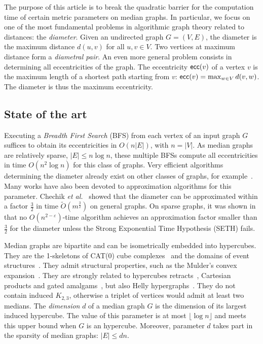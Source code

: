 \documentclass[a4paper,UKenglish,numberwithinsect,cleveref, autoref]{lipics-v2021}
\newcommand{\card}[1]{\left| #1 \right|}
\newcommand{\ecc}{\mbox{\textsf{ecc}}}
\begin{document}
The purpose of this article is to break the quadratic barrier for the computation time of certain metric parameters on median graphs. In particular, we focus on one of the most fundamental problems in algorithmic graph theory related to distances: the \textit{diameter}. Given an undirected graph $G=(V,E)$, the diameter is the maximum distance $d(u,v)$ for all $u,v \in V$. Two vertices at maximum distance form a \textit{diametral pair}. An even more general problem consists in determining all eccentricities of the graph. The eccentricity $\ecc(v)$ of a vertex $v$ is the maximum length of a shortest path starting from $v$: $\ecc(v) = \max_{w \in V} d(v,w)$. The diameter is thus the maximum eccentricity.

\subsection{State of the art}

Executing a \textit{Breadth First Search} (BFS) from each vertex of an input graph $G$ suffices to obtain its eccentricities in $O(n\card{E})$, with $n = \card{V}$. As median graphs are relatively sparse, $\card{E} \le n\log n$, these multiple BFSs compute all eccentricities in time $O(n^2\log n)$ for this class of graphs.
Very efficient algorithms determining the diameter already exist on other classes of graphs, for example~\cite{AbWiWa16,Ca17,DuHaVi20}. Many works have also been devoted to approximation algorithms for this parameter. Chechik {\em et al.}~\cite{ChLaRoScTaWi14} showed that the diameter can be approximated within a factor $\frac{3}{2}$ in time $\tilde{O}(m^{\frac{3}{2}})$ on general graphs. On sparse graphs, it was shown in~\cite{RoWi13} that no $O(n^{2-\varepsilon})$-time algorithm achieves an approximation factor smaller than $\frac{3}{2}$ for the diameter unless the Strong Exponential Time Hypothesis (SETH) fails.

Median graphs are bipartite and can be isometrically embedded into hypercubes. They are the 1-skeletons of CAT(0) cube complexes~\cite{Ch00} and the domains of event structures~\cite{BaCo93}. They admit structural properties, such as the Mulder's convex expansion~\cite{Mu78,Mu80}. They are strongly related to hypercubes retracts~\cite{Ba84}, Cartesian products and gated amalgams~\cite{BaCh08}, but also Helly hypergraphs~\cite{MuSc79}. They do not contain induced $K_{2,3}$, otherwise a triplet of vertices would admit at least two medians. The \textit{dimension} $d$ of a median graph $G$ is the dimension of its largest induced hypercube. The value of this parameter is at most $\lfloor \log n \rfloor$ and meets this upper bound when $G$ is an hypercube. Moreover, parameter $d$ takes part in the sparsity of median graphs: $\card{E} \le dn$.
\end{document}
